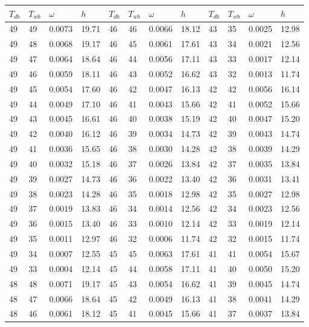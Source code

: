 \begin{tabular}{llll|llll|llll}
 \toprule 
\(T_{db}\) & \(T_{wb}\) & \(\omega\) & \(h\) & \(T_{db}\) & \(T_{wb}\) & \(\omega\) & \(h\) & \(T_{db}\) & \(T_{wb}\) & \(\omega\) & \(h\)  \\ \midrule 
49 & 49 & 0.0073 & 19.71 & 46 & 46 & 0.0066 & 18.12 & 43 & 35 & 0.0025 & 12.98\\
49 & 48 & 0.0068 & 19.17 & 46 & 45 & 0.0061 & 17.61 & 43 & 34 & 0.0021 & 12.56\\
49 & 47 & 0.0064 & 18.64 & 46 & 44 & 0.0056 & 17.11 & 43 & 33 & 0.0017 & 12.14\\
49 & 46 & 0.0059 & 18.11 & 46 & 43 & 0.0052 & 16.62 & 43 & 32 & 0.0013 & 11.74\\
49 & 45 & 0.0054 & 17.60 & 46 & 42 & 0.0047 & 16.13 & 42 & 42 & 0.0056 & 16.14\\
49 & 44 & 0.0049 & 17.10 & 46 & 41 & 0.0043 & 15.66 & 42 & 41 & 0.0052 & 15.66\\
49 & 43 & 0.0045 & 16.61 & 46 & 40 & 0.0038 & 15.19 & 42 & 40 & 0.0047 & 15.20\\
49 & 42 & 0.0040 & 16.12 & 46 & 39 & 0.0034 & 14.73 & 42 & 39 & 0.0043 & 14.74\\
49 & 41 & 0.0036 & 15.65 & 46 & 38 & 0.0030 & 14.28 & 42 & 38 & 0.0039 & 14.29\\
49 & 40 & 0.0032 & 15.18 & 46 & 37 & 0.0026 & 13.84 & 42 & 37 & 0.0035 & 13.84\\
49 & 39 & 0.0027 & 14.73 & 46 & 36 & 0.0022 & 13.40 & 42 & 36 & 0.0031 & 13.41\\
49 & 38 & 0.0023 & 14.28 & 46 & 35 & 0.0018 & 12.98 & 42 & 35 & 0.0027 & 12.98\\
49 & 37 & 0.0019 & 13.83 & 46 & 34 & 0.0014 & 12.56 & 42 & 34 & 0.0023 & 12.56\\
49 & 36 & 0.0015 & 13.40 & 46 & 33 & 0.0010 & 12.14 & 42 & 33 & 0.0019 & 12.14\\
49 & 35 & 0.0011 & 12.97 & 46 & 32 & 0.0006 & 11.74 & 42 & 32 & 0.0015 & 11.74\\
49 & 34 & 0.0007 & 12.55 & 45 & 45 & 0.0063 & 17.61 & 41 & 41 & 0.0054 & 15.67\\
49 & 33 & 0.0004 & 12.14 & 45 & 44 & 0.0058 & 17.11 & 41 & 40 & 0.0050 & 15.20\\
48 & 48 & 0.0071 & 19.17 & 45 & 43 & 0.0054 & 16.62 & 41 & 39 & 0.0045 & 14.74\\
48 & 47 & 0.0066 & 18.64 & 45 & 42 & 0.0049 & 16.13 & 41 & 38 & 0.0041 & 14.29\\
48 & 46 & 0.0061 & 18.12 & 45 & 41 & 0.0045 & 15.66 & 41 & 37 & 0.0037 & 13.84\\

\end{tabular}
